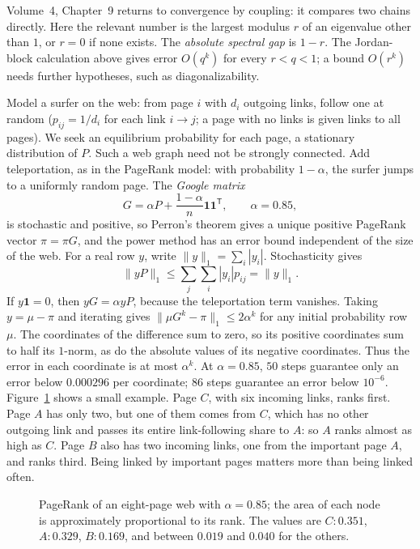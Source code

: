 Volume~4, Chapter~9 returns to convergence by coupling: it compares two chains
directly. Here the relevant number is the largest modulus $r$ of an eigenvalue
other than $1$, or $r=0$ if none exists. The \emph{absolute spectral gap} is
$1-r$. The Jordan-block calculation above gives error $O(q^k)$ for every
$r<q<1$; a bound $O(r^k)$ needs further hypotheses, such as diagonalizability.

\begin{example}[PageRank]\label{linear:exa:pagerank}
Model a surfer on the web: from page $i$ with $d_i$ outgoing links, follow one at random ($p_{ij}=1/d_i$ for each link
$i\to j$; a page with no links is given links to all pages). We seek an equilibrium probability for each page, a stationary distribution
of $P$. Such a web graph need not be strongly connected. Add teleportation,
as in the PageRank model: with probability $1-\alpha$, the surfer jumps to
a uniformly random page. The \emph{Google matrix}
\[
G=\alpha P+\frac{1-\alpha}n\mathbf 1\mathbf 1^{\mathsf T},\qquad\alpha=0.85,
\]
is stochastic and positive, so Perron's theorem gives a unique positive PageRank vector $\pi=\pi G$, and the power method
has an error bound independent of the size of the web. For a real row $y$,
write $\|y\|_1=\sum_i|y_i|$. Stochasticity gives
\[
\|yP\|_1\le\sum_j\sum_i|y_i|p_{ij}=\|y\|_1.
\]
If $y\mathbf1=0$, then $yG=\alpha yP$, because the teleportation term vanishes.
Taking $y=\mu-\pi$ and iterating gives
$\|\mu G^k-\pi\|_1\le2\alpha^k$ for any initial probability row $\mu$.
The coordinates of the difference sum to zero, so its positive coordinates
sum to half its $1$-norm, as do the absolute values of its negative coordinates.
Thus the error in each coordinate is at most $\alpha^k$.
At $\alpha=0.85$, $50$ steps guarantee only an error below $0.000296$ per
coordinate; $86$ steps guarantee an error below $10^{-6}$.
Figure~\ref{linear:fig:pagerank} shows a small example. Page $C$, with six incoming links, ranks first. Page $A$
has only two, but one of them comes from $C$, which has no other outgoing link
and passes its entire link-following share to $A$: so $A$ ranks
almost as high as $C$. Page $B$ also has two incoming links, one from the important page $A$, and ranks third. Being linked by
important pages matters more than being linked often.
\end{example}

\begin{figure}[ht]
\centering
{}
\caption{PageRank of an eight-page web with $\alpha=0.85$; the area of each node is approximately proportional to its rank. The values
are $C:0.351$, $A:0.329$, $B:0.169$, and between $0.019$ and $0.040$ for the others.}
\label{linear:fig:pagerank}
\end{figure}

